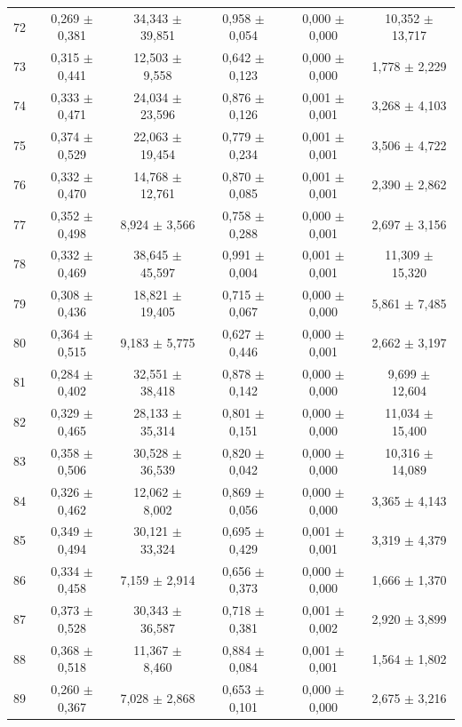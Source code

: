 \begin{tabular}{l c c c c c}
72 & 0,269 $\pm$ 0,381 & 34,343 $\pm$ 39,851 & 0,958 $\pm$ 0,054 & 0,000 $\pm$ 0,000 & 10,352 $\pm$ 13,717 \\
73 & 0,315 $\pm$ 0,441 & 12,503 $\pm$ 9,558 & 0,642 $\pm$ 0,123 & 0,000 $\pm$ 0,000 & 1,778 $\pm$ 2,229 \\
74 & 0,333 $\pm$ 0,471 & 24,034 $\pm$ 23,596 & 0,876 $\pm$ 0,126 & 0,001 $\pm$ 0,001 & 3,268 $\pm$ 4,103 \\
75 & 0,374 $\pm$ 0,529 & 22,063 $\pm$ 19,454 & 0,779 $\pm$ 0,234 & 0,001 $\pm$ 0,001 & 3,506 $\pm$ 4,722 \\
76 & 0,332 $\pm$ 0,470 & 14,768 $\pm$ 12,761 & 0,870 $\pm$ 0,085 & 0,001 $\pm$ 0,001 & 2,390 $\pm$ 2,862 \\
77 & 0,352 $\pm$ 0,498 & 8,924 $\pm$ 3,566 & 0,758 $\pm$ 0,288 & 0,000 $\pm$ 0,001 & 2,697 $\pm$ 3,156 \\
78 & 0,332 $\pm$ 0,469 & 38,645 $\pm$ 45,597 & 0,991 $\pm$ 0,004 & 0,001 $\pm$ 0,001 & 11,309 $\pm$ 15,320 \\
79 & 0,308 $\pm$ 0,436 & 18,821 $\pm$ 19,405 & 0,715 $\pm$ 0,067 & 0,000 $\pm$ 0,000 & 5,861 $\pm$ 7,485 \\
80 & 0,364 $\pm$ 0,515 & 9,183 $\pm$ 5,775 & 0,627 $\pm$ 0,446 & 0,000 $\pm$ 0,001 & 2,662 $\pm$ 3,197 \\
81 & 0,284 $\pm$ 0,402 & 32,551 $\pm$ 38,418 & 0,878 $\pm$ 0,142 & 0,000 $\pm$ 0,000 & 9,699 $\pm$ 12,604 \\
82 & 0,329 $\pm$ 0,465 & 28,133 $\pm$ 35,314 & 0,801 $\pm$ 0,151 & 0,000 $\pm$ 0,000 & 11,034 $\pm$ 15,400 \\
83 & 0,358 $\pm$ 0,506 & 30,528 $\pm$ 36,539 & 0,820 $\pm$ 0,042 & 0,000 $\pm$ 0,000 & 10,316 $\pm$ 14,089 \\
84 & 0,326 $\pm$ 0,462 & 12,062 $\pm$ 8,002 & 0,869 $\pm$ 0,056 & 0,000 $\pm$ 0,000 & 3,365 $\pm$ 4,143 \\
85 & 0,349 $\pm$ 0,494 & 30,121 $\pm$ 33,324 & 0,695 $\pm$ 0,429 & 0,001 $\pm$ 0,001 & 3,319 $\pm$ 4,379 \\
86 & 0,334 $\pm$ 0,458 & 7,159 $\pm$ 2,914 & 0,656 $\pm$ 0,373 & 0,000 $\pm$ 0,000 & 1,666 $\pm$ 1,370 \\
87 & 0,373 $\pm$ 0,528 & 30,343 $\pm$ 36,587 & 0,718 $\pm$ 0,381 & 0,001 $\pm$ 0,002 & 2,920 $\pm$ 3,899 \\
88 & 0,368 $\pm$ 0,518 & 11,367 $\pm$ 8,460 & 0,884 $\pm$ 0,084 & 0,001 $\pm$ 0,001 & 1,564 $\pm$ 1,802 \\
89 & 0,260 $\pm$ 0,367 & 7,028 $\pm$ 2,868 & 0,653 $\pm$ 0,101 & 0,000 $\pm$ 0,000 & 2,675 $\pm$ 3,216 \\

\end{tabular}
